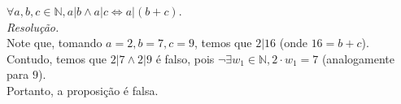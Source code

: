 $\forall a, b, c \in \mathbb{N}, a | b \land a | c \iff a | (b + c)$. \\
\emph{Resolução.} \\
Note que, tomando $a = 2, b = 7, c = 9$, temos que $2 | 16$ (onde $16 = b + c$). Contudo, temos que $2 | 7 \land 2 | 9$ é falso, pois $\lnot \exists w_1 \in \mathbb{N}, 2 \cdot w_1 = 7$ (analogamente para $9$). \\
Portanto, a proposição é falsa.
